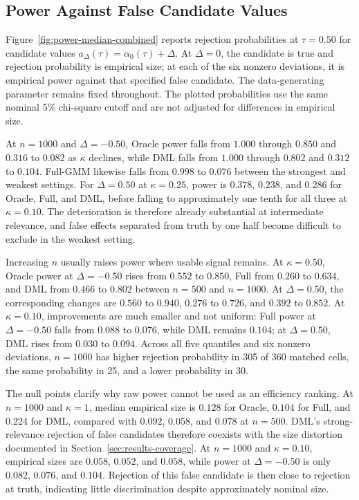 \subsection{Power Against False Candidate Values}
\label{sec:results-power}

Figure~\ref{fig:power-median-combined} reports rejection probabilities at $\tau=0.50$ for candidate values $a_{\Delta}(\tau)=\alpha_0(\tau)+\Delta$. At $\Delta=0$, the candidate is true and rejection probability is empirical size; at each of the six nonzero deviations, it is empirical power against that specified false candidate. The data-generating parameter remains fixed throughout. The plotted probabilities use the same nominal 5\% chi-square cutoff and are not adjusted for differences in empirical size.



At $n=1000$ and $\Delta=-0.50$, Oracle power falls from $1.000$ through $0.850$ and $0.316$ to $0.082$ as $\kappa$ declines, while DML falls from $1.000$ through $0.802$ and $0.312$ to $0.104$. Full-GMM likewise falls from $0.998$ to $0.076$ between the strongest and weakest settings. For $\Delta=0.50$ at $\kappa=0.25$, power is $0.378$, $0.238$, and $0.286$ for Oracle, Full, and DML, before falling to approximately one tenth for all three at $\kappa=0.10$. The deterioration is therefore already substantial at intermediate relevance, and false effects separated from truth by one half become difficult to exclude in the weakest setting.

Increasing $n$ usually raises power where usable signal remains. At $\kappa=0.50$, Oracle power at $\Delta=-0.50$ rises from $0.552$ to $0.850$, Full from $0.260$ to $0.634$, and DML from $0.466$ to $0.802$ between $n=500$ and $n=1000$. At $\Delta=0.50$, the corresponding changes are $0.560$ to $0.940$, $0.276$ to $0.726$, and $0.392$ to $0.852$. At $\kappa=0.10$, improvements are much smaller and not uniform: Full power at $\Delta=-0.50$ falls from $0.088$ to $0.076$, while DML remains $0.104$; at $\Delta=0.50$, DML rises from $0.030$ to $0.094$. Across all five quantiles and six nonzero deviations, $n=1000$ has higher rejection probability in 305 of 360 matched cells, the same probability in 25, and a lower probability in 30.

The null points clarify why raw power cannot be used as an efficiency ranking. At $n=1000$ and $\kappa=1$, median empirical size is $0.128$ for Oracle, $0.104$ for Full, and $0.224$ for DML, compared with $0.092$, $0.058$, and $0.078$ at $n=500$. DML's strong-relevance rejection of false candidates therefore coexists with the size distortion documented in Section~\ref{sec:results-coverage}. At $n=1000$ and $\kappa=0.10$, empirical sizes are $0.058$, $0.052$, and $0.058$, while power at $\Delta=-0.50$ is only $0.082$, $0.076$, and $0.104$. Rejection of this false candidate is then close to rejection at truth, indicating little discrimination despite approximately nominal size.

